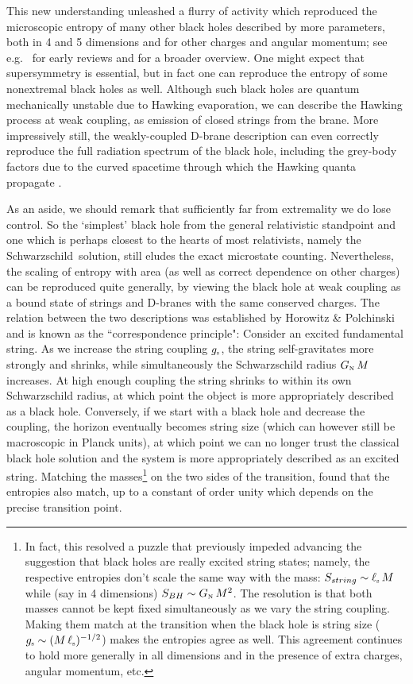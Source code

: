 \documentclass[12pt]{article}
\def\schw{Schwarzschild}
\def\gst{g_{\scriptscriptstyle {\rm s}}}
\def\GN{G_{\scriptscriptstyle {\rm N}}}
\def\lst{\ell_{\scriptscriptstyle {\rm s}}}
\begin{document}
This new understanding unleashed a flurry of activity which
reproduced the microscopic entropy of many other black holes described by more parameters, both in 4 and 5 dimensions and for other charges and angular momentum; see e.g.\ \cite{Horowitz:1996qd,Horowitz:1996rn} for early reviews and \cite{Dabholkar:2012zz} for a broader overview. 
One might expect that supersymmetry is essential, but in fact one can reproduce the entropy of some nonextremal black holes as well.  Although such black holes are quantum mechanically unstable due to Hawking evaporation, we can describe the Hawking process at weak coupling, as emission of closed strings from the brane.  More impressively still, the weakly-coupled D-brane description can even correctly reproduce the full radiation  spectrum of the black hole, including the grey-body factors due to the curved spacetime through which the Hawking quanta propagate  \cite{Maldacena:1996ix}.


As an aside, we should remark that sufficiently far from extremality we do lose control.  So the `simplest' black hole from the general relativistic standpoint and one which is perhaps closest to the hearts of most relativists, namely the \schw\ solution, still eludes the exact microstate counting.  Nevertheless, the scaling of entropy with area (as well as correct dependence on other charges) can be reproduced quite generally, by viewing the black hole at weak coupling as a bound state of strings and D-branes with the same conserved charges.  The relation between the two descriptions was established by Horowitz \& Polchinski    \cite{Horowitz:1996nw} and is known as the ``correspondence principle":
Consider an excited fundamental string.  As we increase the string coupling $\gst$, the string self-gravitates more strongly and shrinks, while simultaneously the Schwarzschild radius $\GN \, M$ increases.  At high enough coupling the string shrinks to within its own Schwarzschild radius, at which point the object is more appropriately described as a black hole.  Conversely, if we start with a black hole and decrease the coupling,  the horizon eventually becomes string size (which can however still be macroscopic in Planck units),  at which point we can no longer trust the classical black hole solution and the system is more appropriately described as an excited string.  Matching the masses\footnote{
In fact, this resolved a puzzle that previously impeded advancing the suggestion \cite{Susskind:1993ws} that black holes are really excited string states; namely, the respective entropies don't scale the same way with the mass:  $S_{string} \sim \lst \, M$ while (say in 4 dimensions) $S_{BH} \sim \GN \, M^2$.  The resolution is that both masses cannot be kept fixed simultaneously as we vary the string coupling.  Making them match at the transition when the black hole is string size ($\gst \sim (M \, \lst)^{-1/2}$) makes the entropies agree as well.  This agreement continues to hold more generally in all dimensions and in the presence of extra charges, angular momentum, etc.
} on the two sides of the transition, \cite{Horowitz:1996nw} found that the entropies also match, up to a constant of order unity which depends on the precise transition point. 
\end{document}
